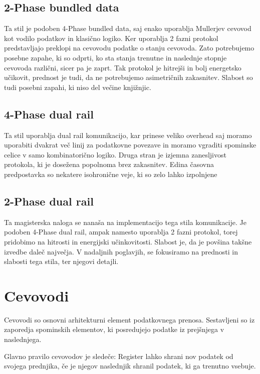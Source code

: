 \subsection{2-Phase bundled data} \label{b}
Ta stil je podoben 4-Phase bundled data, saj enako uporablja Mullerjev cevovod kot vodilo podatkov in klasično logiko. Ker uporablja 2 fazni protokol predstavljajo preklopi na cevovodu podatke o stanju cevovoda. Zato potrebujemo posebne zapahe, ki so odprti, ko sta stanja trenutne in naslednje stopnje cevovoda različni, sicer pa je zaprt. Tak protokol je hitrejši in bolj energetsko učikovit, prednost je tudi, da ne potrebujemo asimetričnih zakasnitev. Slabost so tudi posebni zapahi, ki niso del večine knjižnjic.

\subsection{4-Phase dual rail} \label{b}
Ta stil uporablja dual rail komunikacijo, kar prinese veliko overhead saj moramo uporabiti dvakrat več linij za podatkovne povezave in moramo vgraditi spominske celice v samo kombinatorično logiko. Druga stran je izjemna zanesljivost protokola, ki je dosežena popolnoma brez zakasnitev. Edina časovna predpostavka so nekatere isohronične veje, ki so zelo lahko izpolnjene

\subsection{2-Phase dual rail} \label{b}
Ta magisterska naloga se nanaša na implementacijo tega stila komunikacije. Je podoben 4-Phase dual rail, ampak namesto uporablja 2 fazni protokol, torej pridobimo na hitrosti in energijski učinkovitosti. Slabost je, da je povšina takšne izvedbe daleč največja. V nadaljnih poglavjih, se fokusiramo na prednosti in slabosti tega stila, ter njegovi detajli.




\section{Cevovodi} \label{a}

Cevovodi so osnovni arhitekturni element podatkovnega prenosa. Sestavljeni so iz zaporedja spominskih elementov, ki posredujejo podatke iz prejšnjega v naslednjega.

Glavno pravilo cevovodov je sledeče:
Register lahko shrani nov podatek od svojega prednjika, če je njegov naslednjik shranil podatek, ki ga trenutno vsebuje.



